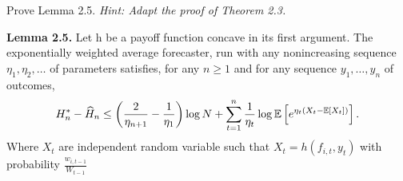 \begin{exercise}[]{}
	Prove Lemma 2.5. \it{Hint:} Adapt the proof of Theorem 2.3.

\textbf{Lemma 2.5.} Let h be a payoff function concave in its first argument. The exponentially weighted average forecaster, run with any nonincreasing sequence $ \eta_1,\eta_2,\ldots $ of parameters satisfies, for any $  n \geq 1 $ and for any sequence $ y_1,\ldots,y_n $ of outcomes,
\begin{equation*}
	H_n^{*} - \widehat{H}_n \leq \left( \frac{2}{\eta_{n+1}} - \frac{1}{\eta_1} \right) \log N + \sum_{t=1}^{n} \frac{1}{\eta_t} \log \mathbb{E}\left[e^{\eta_t(X_t - \mathbb{E}\left[X_t\right])}\right].
\end{equation*}
Where $ X_t $ are independent random variable such that $ X_t = h(f_{i,t},y_t) $ with probability $ \frac{w_{i,t-1}}{W_{t-1}} $
\end{exercise}

